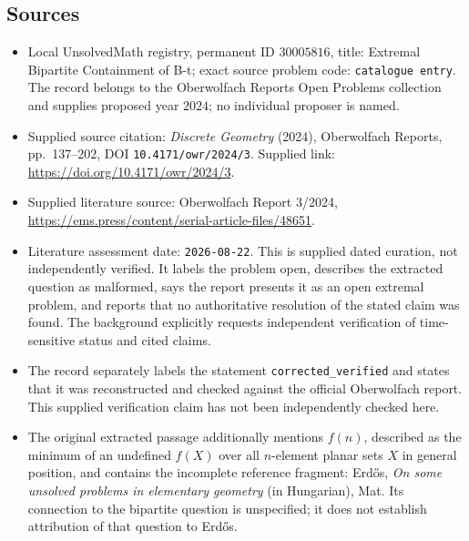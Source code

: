 \documentclass[11pt]{article}
\begin{document}
\subsection{Sources}
\begin{itemize}
\item Local UnsolvedMath registry, permanent ID \(30005816\), title: Extremal Bipartite Containment of B-t; exact source problem code: \texttt{catalogue entry}. The record belongs to the Oberwolfach Reports Open Problems collection and supplies proposed year \(2024\); no individual proposer is named.
\item Supplied source citation: \emph{Discrete Geometry} (2024), Oberwolfach Reports, pp.\ 137--202, DOI \texttt{10.4171/owr/2024/3}. Supplied link: \url{https://doi.org/10.4171/owr/2024/3}.
\item Supplied literature source: Oberwolfach Report 3/2024, \url{https://ems.press/content/serial-article-files/48651}.
\item Literature assessment date: \texttt{2026-08-22}. This is supplied dated curation, not independently verified. It labels the problem open, describes the extracted question as malformed, says the report presents it as an open extremal problem, and reports that no authoritative resolution of the stated claim was found. The background explicitly requests independent verification of time-sensitive status and cited claims.
\item The record separately labels the statement \texttt{corrected\_verified} and states that it was reconstructed and checked against the official Oberwolfach report. This supplied verification claim has not been independently checked here.
\item The original extracted passage additionally mentions \(f(n)\), described as the minimum of an undefined \(f(X)\) over all \(n\)-element planar sets \(X\) in general position, and contains the incomplete reference fragment: Erd\H{o}s, \emph{On some unsolved problems in elementary geometry} (in Hungarian), Mat. Its connection to the bipartite question is unspecified; it does not establish attribution of that question to Erd\H{o}s.
\end{itemize}
\end{document}
